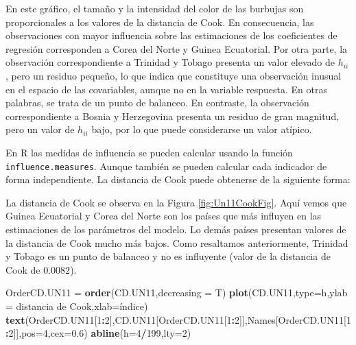 \documentclass[
]{article}
\newenvironment{Shaded}{\begin{snugshade}}{\end{snugshade}}
\newcommand{\AttributeTok}[1]{\textcolor[rgb]{0.13,0.29,0.53}{#1}}
\newcommand{\DecValTok}[1]{\textcolor[rgb]{0.00,0.00,0.81}{#1}}
\newcommand{\FloatTok}[1]{\textcolor[rgb]{0.00,0.00,0.81}{#1}}
\newcommand{\FunctionTok}[1]{\textcolor[rgb]{0.13,0.29,0.53}{\textbf{#1}}}
\newcommand{\NormalTok}[1]{#1}
\newcommand{\OtherTok}[1]{\textcolor[rgb]{0.56,0.35,0.01}{#1}}
\newcommand{\SpecialCharTok}[1]{\textcolor[rgb]{0.81,0.36,0.00}{\textbf{#1}}}
\newcommand{\StringTok}[1]{\textcolor[rgb]{0.31,0.60,0.02}{#1}}
\begin{document}
En este gráfico, el tamaño y la intensidad del color de las burbujas son proporcionales a los valores de la distancia de Cook. En consecuencia, las observaciones con mayor influencia sobre las estimaciones de los coeficientes de regresión corresponden a Corea del Norte y Guinea Ecuatorial. Por otra parte, la observación correspondiente a Trinidad y Tobago presenta un valor elevado de \(h_{ii}\), pero un residuo pequeño, lo que indica que constituye una observación inusual en el espacio de las covariables, aunque no en la variable respuesta. En otras palabras, se trata de un punto de balanceo. En contraste, la observación correspondiente a Bosnia y Herzegovina presenta un residuo de gran magnitud, pero un valor de \(h_{ii}\) bajo, por lo que puede considerarse un valor atípico.

En R las medidas de influencia se pueden calcular usando la función \texttt{influence.measures}. Aunque también se pueden calcular cada indicador de forma independiente. La distancia de Cook puede obtenerse de la siguiente forma:

La distancia de Cook se observa en la Figura \ref{fig:Un11CookFig}. Aquí vemos que Guinea Ecuatorial y Corea del Norte son los países que más influyen en las estimaciones de los parámetros del modelo. Lo demás países presentan valores de la distancia de Cook mucho más bajos. Como resaltamos anteriormente, Trinidad y Tobago es un punto de balanceo y no es influyente (valor de la distancia de Cook de \(0.0082\)).

\begin{Shaded}
\begin{Highlighting}[]
\NormalTok{OrderCD.UN11 }\OtherTok{=} \FunctionTok{order}\NormalTok{(CD.UN11,}\AttributeTok{decreasing =}\NormalTok{ T)}
\FunctionTok{plot}\NormalTok{(CD.UN11,}\AttributeTok{type=}\StringTok{\textquotesingle{}h\textquotesingle{}}\NormalTok{,}\AttributeTok{ylab =} \StringTok{\textquotesingle{}distancia de Cook\textquotesingle{}}\NormalTok{,}\AttributeTok{xlab=}\StringTok{\textquotesingle{}índice\textquotesingle{}}\NormalTok{)}
\FunctionTok{text}\NormalTok{(OrderCD.UN11[}\DecValTok{1}\SpecialCharTok{:}\DecValTok{2}\NormalTok{],CD.UN11[OrderCD.UN11[}\DecValTok{1}\SpecialCharTok{:}\DecValTok{2}\NormalTok{]],Names[OrderCD.UN11[}\DecValTok{1}\SpecialCharTok{:}\DecValTok{2}\NormalTok{]],}\AttributeTok{pos=}\DecValTok{4}\NormalTok{,}\AttributeTok{cex=}\FloatTok{0.6}\NormalTok{)}
\FunctionTok{abline}\NormalTok{(}\AttributeTok{h=}\DecValTok{4}\SpecialCharTok{/}\DecValTok{199}\NormalTok{,}\AttributeTok{lty=}\DecValTok{2}\NormalTok{)}
\end{Highlighting}
\end{Shaded}
\end{document}
